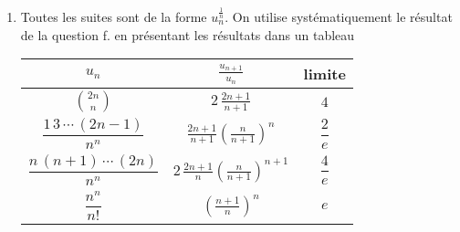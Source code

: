 \begin{enumerate}
 \item Toutes les suites sont de la forme $u_n^{\frac{1}{n}}$. On utilise systématiquement le résultat de la question f. en présentant les résultats dans un tableau
\begin{center}
\renewcommand{\arraystretch}{2.6}
\begin{tabular}{|c|c|c|} \hline
$u_n$ & $\frac{u_{n+1}}{u_n}$ & limite\\ \hline
$\binom{2n}{n}$ & $2\,\frac{2n+1}{n+1}$ & $4$ \\ \hline
$\dfrac{1\, 3\, \cdots\, (2n-1)}{n^{n}}$ & $\frac{2n+1}{n+1}(\frac{n}{n+1})^n$ & $\dfrac{2}{e}$ \\ \hline
$\dfrac{n\, (n+1)\, \cdots\, (2n)}{n^{n}}$ & $2\,\frac{2n+1}{n}(\frac{n}{n+1})^{n+1}$ & $\dfrac{4}{e}$ \\ \hline
$\dfrac{n^{n}}{n!}$ & $(\frac{n + 1}{n})^{n}$ &  $e$ \\ \hline
\end{tabular}
\bigskip
\end{center}

\end{enumerate}
